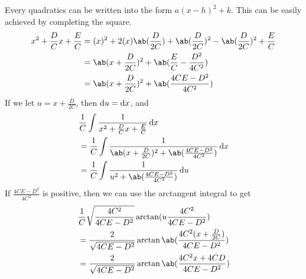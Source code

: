 Every quadratics can be written into the form \(a(x - h)^2 + k\). This can be easily achieved by completing the square.
\begin{align}
	x^2 + \frac{D}{C}x + \frac{E}{C} & = (x)^2 + 2(x)\ab(\frac{D}{2C}) + \ab(\frac{D}{2C})^2 - \ab(\frac{D}{2C})^2 + \frac{E}{C} \\
	                                 & = \ab(x + \frac{D}{2C})^2 + \ab(\frac{E}{C} - \frac{D^2}{4C^2})                           \\
	                                 & = \ab(x + \frac{D}{2C})^2 + \ab(\frac{4CE - D^2}{4C^2})
\end{align}
If we let \(u = x + \frac{D}{2C}\), then \(\odif{u} = \odif{x}\), and
\begin{align}
	 & \frac{1}{C}\int\frac{1}{x^2 + \frac{D}{C}x + \frac{E}{C}}\odif{x} \nonumber               \\
	 & = \frac{1}{C}\int\frac{1}{\ab(x + \frac{D}{2C})^2 + \ab(\frac{4CE - D^2}{4C^2})} \odif{x} \\
	 & = \frac{1}{C}\int\frac{1}{u^2 + \ab(\frac{4CE - D^2}{4C^2})} \odif{u}
\end{align}
If \(\frac{4CE - D^2}{4C^2}\) is positive, then we can use the arctangent integral to get
\begin{align}
	 & \frac{1}{C}\sqrt{\frac{4C^2}{4CE - D^2}}\arctan(u\frac{4C^2}{4CE - D^2})         \\
	 & = \frac{2}{\sqrt{4CE - D^2}}\arctan\ab(\frac{4C^2(x + \frac{D}{2C})}{4CE - D^2}) \\
	 & = \frac{2}{\sqrt{4CE - D^2}}\arctan\ab(\frac{4C^2x + 4CD}{4CE - D^2})
\end{align}


